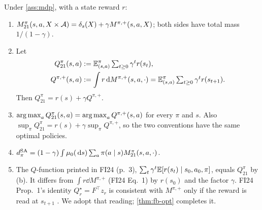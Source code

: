\begin{proposition}\label{prop:occ-conv}
Under \cref{ass:mdp}, with a state reward $r$:
\begin{enumerate}[nosep,label=(\alph*)]
\item $M^\pi_{21}(s,a,X\times\mathcal{A})=\delta_s(X)+\gamma M^{\pi,+}(s,a,X)$; both sides have total mass $1/(1-\gamma)$.
\item Let
  \begin{align*}
  Q^\pi_{21}(s,a)&:=\mathbb{E}^\pi_{(s,a)}\textstyle\sum_{t\ge0}\gamma^tr(s_t),\\
  Q^{\pi,+}(s,a)&:=\int r\,\mathrm{d} M^{\pi,+}(s,a,\cdot)=\mathbb{E}^\pi_{(s,a)}\textstyle\sum_{t\ge0}\gamma^tr(s_{t+1}).
  \end{align*}
  Then $Q^\pi_{21}=r(s)+\gamma Q^{\pi,+}$.
\item $\operatorname*{arg\,max}_aQ^\pi_{21}(s,a)=\operatorname*{arg\,max}_aQ^{\pi,+}(s,a)$ for every $\pi$ and $s$. Also $\sup_\pi Q^\pi_{21}=r(s)+\gamma\sup_\pi Q^{\pi,+}$, so the two conventions have the same optimal policies.
\item $d^{\mathrm{SA}}_\pi=(1-\gamma)\int\mu_0(\,\mathrm{d} s)\sum_a\pi(a\mid s)M^\pi_{21}(s,a,\cdot)$.
\item The $Q$-function printed in FI24 (p.~3), $\sum_t\gamma^t\mathbb{E}[r(s_t)\mid s_0,a_0,\pi]$, equals $Q^\pi_{21}$ by (b). It differs from $\int r\dd M^{\pi,+}$ (FI24 Eq.~1) by $r(s_0)$ and the factor $\gamma$. FI24 Prop.~1's identity $Q^\star_r=F^\top z_r$ is consistent with $M^{\pi,+}$ only if the reward is read at $s_{t+1}$ . We adopt that reading; \cref{thm:fb-opt} completes it.
\end{enumerate}
\end{proposition}
